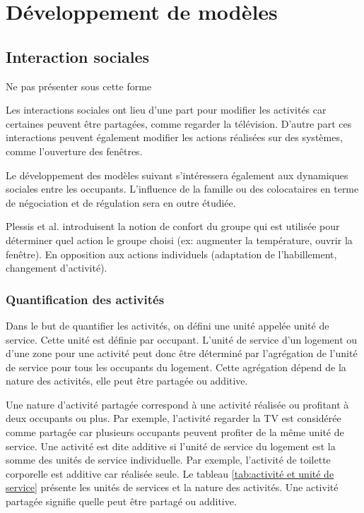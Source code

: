 \chapter{Développement de modèles}

\section{Interaction sociales}
Ne pas présenter sous cette forme

Les interactions sociales ont lieu d'une part pour modifier les activités car certaines peuvent être partagées, comme regarder la télévision. D'autre part ces interactions peuvent également modifier les actions réalisées sur des systèmes, comme l'ouverture des fenêtres.

Le développement des modèles suivant s'intéressera également aux dynamiques sociales entre les occupants. L'influence de la famille ou des colocataires en terme de négociation et de régulation sera en outre étudiée.

Plessis et al. \cite{Plessis-14} introduisent la notion de confort du groupe qui est utilisée pour déterminer quel action le groupe choisi (ex: augmenter la température, ouvrir la fenêtre). En opposition aux actions individuels (adaptation de l'habillement, changement d'activité).

\subsection{Quantification des activités}

Dans le but de quantifier les activités, on défini une unité appelée unité de service. Cette unité est définie par occupant. L'unité de service d'un logement ou d'une zone pour une activité peut donc être déterminé par l'agrégation de l'unité de service pour tous les occupants du logement. Cette agrégation dépend de la nature des activités, elle peut être partagée ou additive.

Une nature d'activité partagée correspond à une activité réalisée ou profitant à deux occupants ou plus. Par exemple, l'activité regarder la TV est considérée comme partagée car plusieurs occupants peuvent profiter de la même unité de service. Une activité est dite additive si l'unité de service du logement est la somme des unités de service individuelle. Par exemple, l'activité de toilette corporelle est additive car réalisée seule. Le tableau \ref{tab:activité et unité de service} présente les unités de services et la nature des activités. Une activité partagée signifie quelle peut être partagé ou additive.

